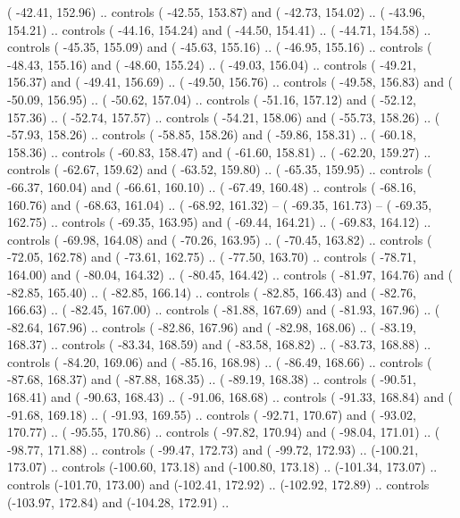 {        ( -42.41, 152.96) .. controls ( -42.55, 153.87) and ( -42.73, 154.02) ..
        ( -43.96, 154.21) .. controls ( -44.16, 154.24) and ( -44.50, 154.41) ..
        ( -44.71, 154.58) .. controls ( -45.35, 155.09) and ( -45.63, 155.16) ..
        ( -46.95, 155.16) .. controls ( -48.43, 155.16) and ( -48.60, 155.24) ..
        ( -49.03, 156.04) .. controls ( -49.21, 156.37) and ( -49.41, 156.69) ..
        ( -49.50, 156.76) .. controls ( -49.58, 156.83) and ( -50.09, 156.95) ..
        ( -50.62, 157.04) .. controls ( -51.16, 157.12) and ( -52.12, 157.36) ..
        ( -52.74, 157.57) .. controls ( -54.21, 158.06) and ( -55.73, 158.26) ..
        ( -57.93, 158.26) .. controls ( -58.85, 158.26) and ( -59.86, 158.31) ..
        ( -60.18, 158.36) .. controls ( -60.83, 158.47) and ( -61.60, 158.81) ..
        ( -62.20, 159.27) .. controls ( -62.67, 159.62) and ( -63.52, 159.80) ..
        ( -65.35, 159.95) .. controls ( -66.37, 160.04) and ( -66.61, 160.10) ..
        ( -67.49, 160.48) .. controls ( -68.16, 160.76) and ( -68.63, 161.04) ..
        ( -68.92, 161.32) -- 
        ( -69.35, 161.73) -- 
        ( -69.35, 162.75) .. controls ( -69.35, 163.95) and ( -69.44, 164.21) ..
        ( -69.83, 164.12) .. controls ( -69.98, 164.08) and ( -70.26, 163.95) ..
        ( -70.45, 163.82) .. controls ( -72.05, 162.78) and ( -73.61, 162.75) ..
        ( -77.50, 163.70) .. controls ( -78.71, 164.00) and ( -80.04, 164.32) ..
        ( -80.45, 164.42) .. controls ( -81.97, 164.76) and ( -82.85, 165.40) ..
        ( -82.85, 166.14) .. controls ( -82.85, 166.43) and ( -82.76, 166.63) ..
        ( -82.45, 167.00) .. controls ( -81.88, 167.69) and ( -81.93, 167.96) ..
        ( -82.64, 167.96) .. controls ( -82.86, 167.96) and ( -82.98, 168.06) ..
        ( -83.19, 168.37) .. controls ( -83.34, 168.59) and ( -83.58, 168.82) ..
        ( -83.73, 168.88) .. controls ( -84.20, 169.06) and ( -85.16, 168.98) ..
        ( -86.49, 168.66) .. controls ( -87.68, 168.37) and ( -87.88, 168.35) ..
        ( -89.19, 168.38) .. controls ( -90.51, 168.41) and ( -90.63, 168.43) ..
        ( -91.06, 168.68) .. controls ( -91.33, 168.84) and ( -91.68, 169.18) ..
        ( -91.93, 169.55) .. controls ( -92.71, 170.67) and ( -93.02, 170.77) ..
        ( -95.55, 170.86) .. controls ( -97.82, 170.94) and ( -98.04, 171.01) ..
        ( -98.77, 171.88) .. controls ( -99.47, 172.73) and ( -99.72, 172.93) ..
        (-100.21, 173.07) .. controls (-100.60, 173.18) and (-100.80, 173.18) ..
        (-101.34, 173.07) .. controls (-101.70, 173.00) and (-102.41, 172.92) ..
        (-102.92, 172.89) .. controls (-103.97, 172.84) and (-104.28, 172.91) ..
}
